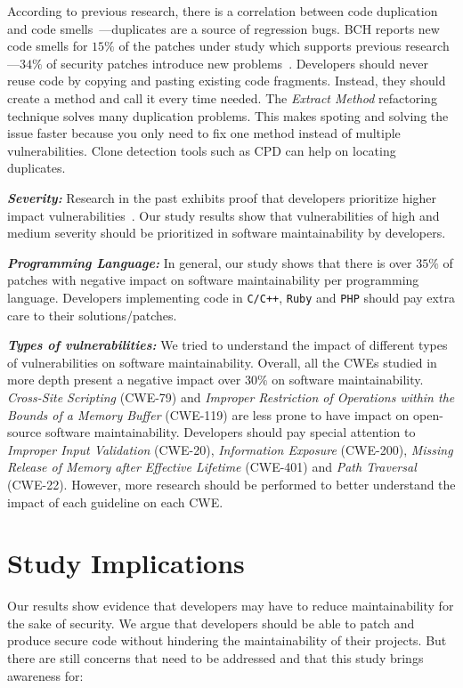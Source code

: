 \documentclass[smallextended]{svjour3}       %
\begin{document}
According to previous research, there is a correlation between 
code duplication and code smells~\cite{7476787}---duplicates are a source 
of regression bugs. BCH reports new code smells
for $15\%$ of the patches under study which supports previous research---$34\%$ of security patches 
introduce new problems~\cite{8819456,10.1145/3133956.3134072}. 
Developers should never reuse code by copying and pasting 
existing code fragments. Instead, they should create a method and call 
it every time needed. The \emph{Extract Method} refactoring 
technique solves many duplication problems. This makes spoting and 
solving the issue faster because you only need to fix one method instead
of multiple vulnerabilities. Clone detection tools such as CPD can help 
on locating duplicates.

\textit{\textbf{Severity:}} Research in the past exhibits proof that developers prioritize
higher impact vulnerabilities~\cite{10.1145/3133956.3134072}.
Our study results show that vulnerabilities of high and
medium severity should be prioritized in software maintainability
by developers.

\textit{\textbf{Programming Language:}} In general, our study 
shows that there is over $35\%$ of patches with negative impact 
on software maintainability per programming language. Developers implementing code in   
\texttt{C/C++}, \texttt{Ruby} and \texttt{PHP} should pay extra care 
to their solutions/patches.

\textit{\textbf{Types of vulnerabilities:}} We tried to understand 
the impact of different types of vulnerabilities on software maintainability.
Overall, all the CWEs studied in more depth present a negative impact
over $30\%$ on software maintainability. 
\emph{Cross-Site Scripting} (CWE-79) and \emph{Improper 
Restriction of Operations within the Bounds of a Memory Buffer} (CWE-119) 
are less prone to have impact on open-source software maintainability.
Developers should pay special attention to \emph{Improper Input Validation} (CWE-20), 
\emph{Information Exposure} (CWE-200), \emph{Missing Release of Memory after Effective Lifetime} 
(CWE-401) and \emph{Path Traversal} (CWE-22). However, 
more research should be performed to better understand 
the impact of each guideline on each CWE.


\section{Study Implications}\label{sec:implications}
%
Our results show evidence that developers may have to reduce maintainability for the 
sake of security. We argue that developers should be able to patch and produce 
secure code without hindering the maintainability of their projects. But there are 
still concerns that need to be addressed and that this study brings awareness for:
%
\end{document}
